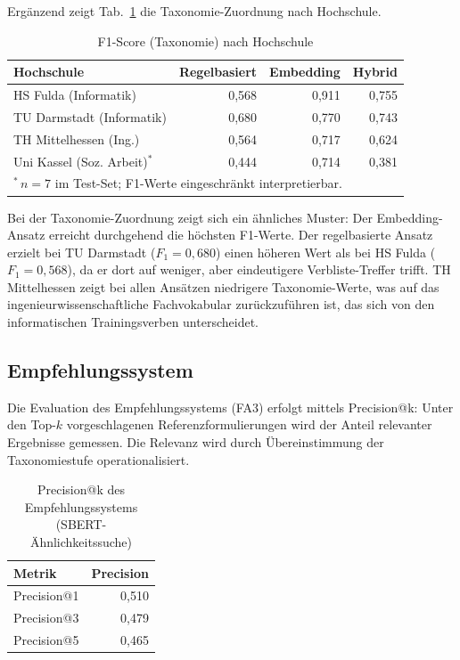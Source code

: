 Ergänzend zeigt Tab.~\ref{tab:eval-hochschule-tax} die Taxonomie-Zuordnung nach Hochschule.

\begin{table}[H]
\caption{F1-Score (Taxonomie) nach Hochschule\label{tab:eval-hochschule-tax}}
\centering
\begin{tabular}{lrrr}
\hline
\textbf{Hochschule} & \textbf{Regelbasiert} & \textbf{Embedding} & \textbf{Hybrid} \\
\hline
HS Fulda (Informatik) & 0{,}568 & 0{,}911 & 0{,}755 \\
TU Darmstadt (Informatik) & 0{,}680 & 0{,}770 & 0{,}743 \\
TH Mittelhessen (Ing.) & 0{,}564 & 0{,}717 & 0{,}624 \\
Uni Kassel (Soz. Arbeit)$^*$ & 0{,}444 & 0{,}714 & 0{,}381 \\
\hline
\multicolumn{4}{l}{\scriptsize $^*$\,$n = 7$ im Test-Set; F1-Werte eingeschränkt interpretierbar.} \\
\end{tabular}
\end{table}

Bei der Taxonomie-Zuordnung zeigt sich ein ähnliches Muster: Der Embedding-Ansatz erreicht durchgehend die höchsten F1-Werte.
Der regelbasierte Ansatz erzielt bei TU Darmstadt ($F_1 = 0{,}680$) einen höheren Wert als bei HS Fulda ($F_1 = 0{,}568$), da er dort auf weniger, aber eindeutigere Verbliste-Treffer trifft.
TH Mittelhessen zeigt bei allen Ansätzen niedrigere Taxonomie-Werte, was auf das ingenieurwissenschaftliche Fachvokabular zurückzuführen ist, das sich von den informatischen Trainingsverben unterscheidet.

\subsection{Empfehlungssystem}\label{sec:eval-empfehlung}

Die Evaluation des Empfehlungssystems (FA3) erfolgt mittels Precision@k: Unter den Top-$k$ vorgeschlagenen Referenzformulierungen wird der Anteil relevanter Ergebnisse gemessen.
Die Relevanz wird durch Übereinstimmung der Taxonomiestufe operationalisiert.

\begin{table}[H]
\caption{Precision@k des Empfehlungssystems (SBERT-Ähnlichkeitssuche)\label{tab:eval-precision-k}}
\centering
\begin{tabular}{lr}
\hline
\textbf{Metrik} & \textbf{Precision} \\
\hline
Precision@1 & 0{,}510 \\
Precision@3 & 0{,}479 \\
Precision@5 & 0{,}465 \\
\hline
\end{tabular}
\end{table}

